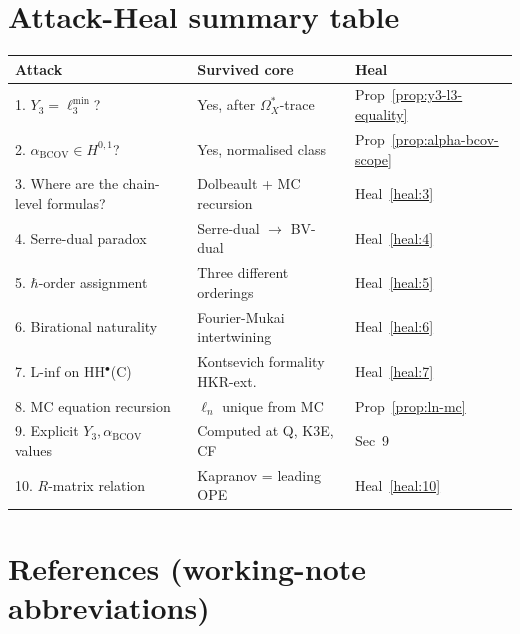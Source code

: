 \documentclass[11pt]{article}
\providecommand{\BCOV}{\mathrm{BCOV}}
\providecommand{\Om}{\Omega}
\begin{document}
\section*{Attack-Heal summary table}

\begin{center}
\begin{tabular}{lll}
Attack & Survived core & Heal \\
\hline
1. $Y_3 = \ell_3^{\min}$? & Yes, after $\Om_X^*$-trace &
  Prop~\ref{prop:y3-l3-equality} \\
2. $\alpha_\BCOV \in H^{0,1}$? & Yes, normalised class &
  Prop~\ref{prop:alpha-bcov-scope} \\
3. Where are the chain-level formulas? & Dolbeault + MC recursion &
  Heal~\ref{heal:3} \\
4. Serre-dual paradox & Serre-dual $\to$ BV-dual & Heal~\ref{heal:4} \\
5. $\hbar$-order assignment & Three different orderings & Heal~\ref{heal:5} \\
6. Birational naturality & Fourier-Mukai intertwining & Heal~\ref{heal:6} \\
7. L-inf on HH${}^\bullet$(C) & Kontsevich formality HKR-ext.\ &
  Heal~\ref{heal:7} \\
8. MC equation recursion & $\ell_n$ unique from MC & Prop~\ref{prop:ln-mc} \\
9. Explicit $Y_3, \alpha_\BCOV$ values & Computed at Q, K3E, CF & Sec~9 \\
10. $R$-matrix relation & Kapranov = leading OPE & Heal~\ref{heal:10} \\
\end{tabular}
\end{center}

\section*{References (working-note abbreviations)}
\end{document}
